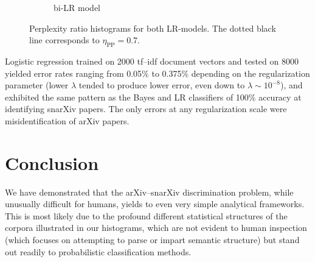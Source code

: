 \documentclass{article}
\begin{document}
\begin{figure}[!htbp]
\begin{subfigure}[t]{0.48\textwidth}
  \caption{bi-LR model}
\end{subfigure}
\caption{Perplexity ratio histograms for both LR-models. The dotted black line corresponds to $\eta_\text{PP}=0.7$.}
\label{fig:histograms}
\end{figure}

Logistic regression trained on 2000 tf--idf document vectors and tested on 8000 yielded error rates ranging from 0.05\% to 0.375\% depending on the regularization parameter (lower $\lambda$ tended to produce lower error, even down to $\lambda \sim 10^{-8}$), and exhibited the same pattern as the Bayes and LR classifiers of 100\% accuracy at identifying snarXiv papers. The only errors at any regularization scale were misidentification of arXiv papers.








\section{Conclusion}
We have demonstrated that the arXiv--snarXiv discrimination problem, while unusually difficult for humans, yields to even very simple analytical frameworks. This is most likely due to the profound different statistical structures of the corpora illustrated in our histograms, which are not evident to human inspection (which focuses on attempting to parse or impart semantic structure) but stand out readily to probabilistic classification methods.















\end{document}

